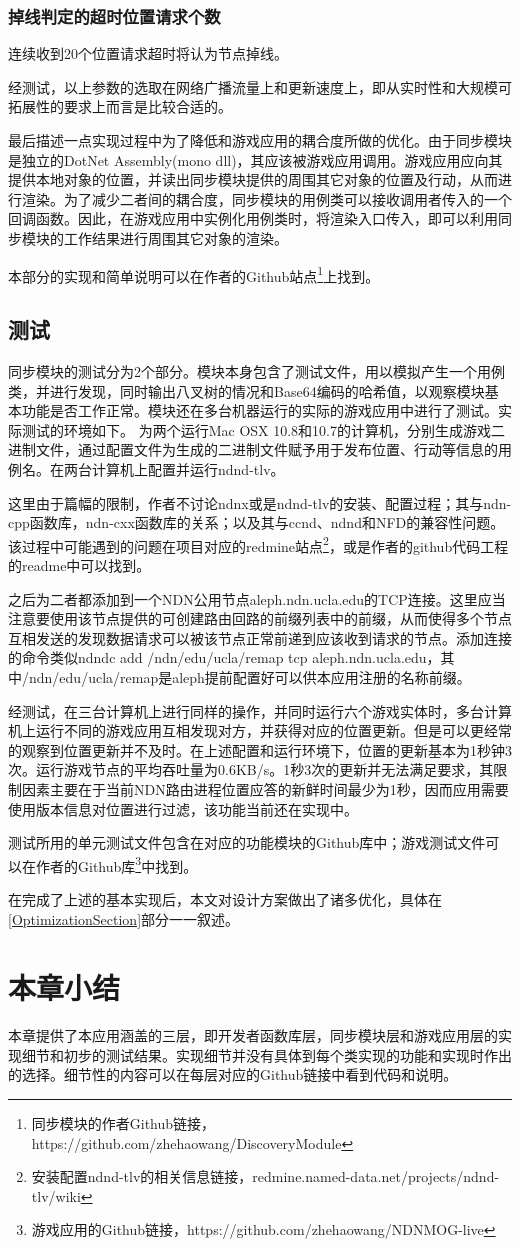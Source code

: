 \subsubsection{掉线判定的超时位置请求个数}
连续收到20个位置请求超时将认为节点掉线。
\par
经测试，以上参数的选取在网络广播流量上和更新速度上，即从实时性和大规模可拓展性的要求上而言是比较合适的。
\par
最后描述一点实现过程中为了降低和游戏应用的耦合度所做的优化。由于同步模块是独立的DotNet Assembly(mono dll)，其应该被游戏应用调用。游戏应用应向其提供本地对象的位置，并读出同步模块提供的周围其它对象的位置及行动，从而进行渲染。为了减少二者间的耦合度，同步模块的用例类可以接收调用者传入的一个回调函数。因此，在游戏应用中实例化用例类时，将渲染入口传入，即可以利用同步模块的工作结果进行周围其它对象的渲染。
\par
本部分的实现和简单说明可以在作者的Github站点\footnote{同步模块的作者Github链接，https://github.com/zhehaowang/DiscoveryModule}上找到。
\subsection{测试}
\par
同步模块的测试分为2个部分。模块本身包含了测试文件，用以模拟产生一个用例类，并进行发现，同时输出八叉树的情况和Base64编码的哈希值，以观察模块基本功能是否工作正常。模块还在多台机器运行的实际的游戏应用中进行了测试。实际测试的环境如下。
为两个运行Mac OSX 10.8和10.7的计算机，分别生成游戏二进制文件，通过配置文件为生成的二进制文件赋予用于发布位置、行动等信息的用例名。在两台计算机上配置并运行ndnd-tlv。
\par
这里由于篇幅的限制，作者不讨论ndnx或是ndnd-tlv的安装、配置过程；其与ndn-cpp函数库，ndn-cxx函数库的关系；以及其与ccnd、ndnd和NFD的兼容性问题。该过程中可能遇到的问题在项目对应的redmine站点\footnote{安装配置ndnd-tlv的相关信息链接，redmine.named-data.net/projects/ndnd-tlv/wiki}，或是作者的github代码工程的readme中可以找到。
\par
之后为二者都添加到一个NDN公用节点aleph.ndn.ucla.edu的TCP连接。这里应当注意要使用该节点提供的可创建路由回路的前缀列表中的前缀，从而使得多个节点互相发送的发现数据请求可以被该节点正常前递到应该收到请求的节点。添加连接的命令类似ndndc add /ndn/edu/ucla/remap tcp aleph.ndn.ucla.edu，其中/ndn/edu/ucla/remap是aleph提前配置好可以供本应用注册的名称前缀。
\par
经测试，在三台计算机上进行同样的操作，并同时运行六个游戏实体时，多台计算机上运行不同的游戏应用互相发现对方，并获得对应的位置更新。但是可以更经常的观察到位置更新并不及时。在上述配置和运行环境下，位置的更新基本为1秒钟3次。运行游戏节点的平均吞吐量为0.6KB/s。1秒3次的更新并无法满足要求，其限制因素主要在于当前NDN路由进程位置应答的新鲜时间最少为1秒，因而应用需要使用版本信息对位置进行过滤，该功能当前还在实现中。
\par
测试所用的单元测试文件包含在对应的功能模块的Github库中；游戏测试文件可以在作者的Github库\footnote{游戏应用的Github链接，https://github.com/zhehaowang/NDNMOG-live}中找到。
\par
在完成了上述的基本实现后，本文对设计方案做出了诸多优化，具体在\ref{OptimizationSection}部分一一叙述。
\section{本章小结}
本章提供了本应用涵盖的三层，即开发者函数库层，同步模块层和游戏应用层的实现细节和初步的测试结果。实现细节并没有具体到每个类实现的功能和实现时作出的选择。细节性的内容可以在每层对应的Github链接中看到代码和说明。